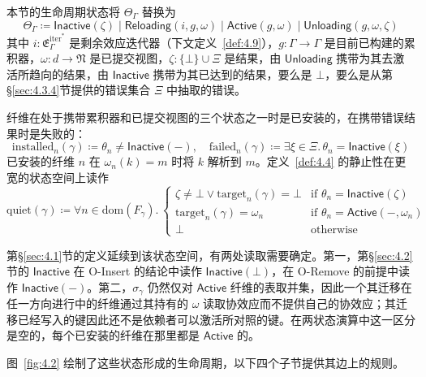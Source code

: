 \begin{definition}\label{def:4.7}
本节的生命周期状态将 $\Theta_\Gamma$ 替换为
\begin{equation}\label{eq:4.7}
\Theta_\Gamma \coloneqq \mathsf{Inactive}(\zeta) \mid \mathsf{Reloading}(i, g, \omega) \mid \mathsf{Active}(g, \omega) \mid \mathsf{Unloading}(g, \omega, \zeta)
\end{equation}
其中 $i: \mathfrak{E}^{\mathrm{iter}^*}_\Gamma$ 是剩余效应迭代器（下文定义~\ref{def:4.9}），$g: \Gamma \to \Gamma$ 是目前已构建的累积器，$\omega: d \to \mathfrak{N}$ 是已提交视图，$\zeta: \{\bot\} \cup \Xi$ 是结果，由 $\mathsf{Unloading}$ 携带为其去激活所趋向的结果，由 $\mathsf{Inactive}$ 携带为其已达到的结果，要么是 $\bot$，要么是从第\S\ref{sec:4.3.4}节提供的错误集合 $\Xi$ 中抽取的错误。
\end{definition}

纤维在处于携带累积器和已提交视图的三个状态之一时是已安装的，在携带错误结果时是失败的：
\begin{equation}\label{eq:4.8}
\mathrm{installed}_n(\gamma) \coloneqq \theta_n \neq \mathsf{Inactive}(-),\quad \mathrm{failed}_n(\gamma) \coloneqq \exists \xi \in \Xi.\, \theta_n = \mathsf{Inactive}(\xi)
\end{equation}
已安装的纤维 $n$ 在 $\omega_n(k) = m$ 时将 $k$ 解析到 $m$。定义~\ref{def:4.4} 的静止性在更宽的状态空间上读作
\begin{equation}\label{eq:4.9}
\mathrm{quiet}(\gamma) \coloneqq \forall n \in \mathrm{dom}(F_\gamma).\, \begin{cases}
\zeta \neq \bot \lor \mathrm{target}_n(\gamma) = \bot & \text{if } \theta_n = \mathsf{Inactive}(\zeta) \\
\mathrm{target}_n(\gamma) = \omega_n & \text{if } \theta_n = \mathsf{Active}(-, \omega_n) \\
\bot & \text{otherwise}
\end{cases}
\end{equation}

第\S\ref{sec:4.1}节的定义延续到该状态空间，有两处读取需要确定。第一，第\S\ref{sec:4.2}节的 $\mathsf{Inactive}$ 在 O-Insert 的结论中读作 $\mathsf{Inactive}(\bot)$，在 O-Remove 的前提中读作 $\mathsf{Inactive}(-)$。第二，$\sigma_\gamma$ 仍然仅对 $\mathsf{Active}$ 纤维的表取并集，因此一个其迁移在任一方向进行中的纤维通过其持有的 $\omega$ 读取协效应而不提供自己的协效应；其迁移已经写入的键因此还不是依赖者可以激活所对照的键。在两状态演算中这一区分是空的，每个已安装的纤维在那里都是 $\mathsf{Active}$ 的。

图~\ref{fig:4.2} 绘制了这些状态形成的生命周期，以下四个子节提供其边上的规则。

